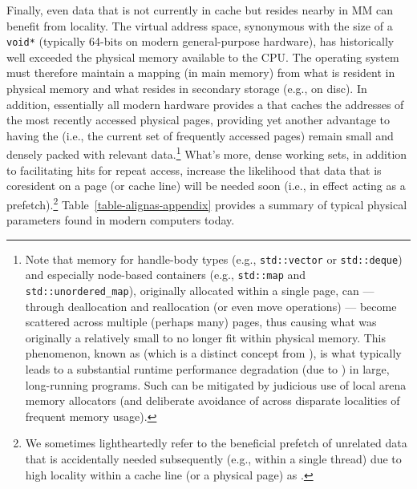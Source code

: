 Finally, even data that is not currently in cache but resides nearby in
MM can benefit from locality. The virtual address space, synonymous with
the size of a \lstinline!void*! (typically 64-bits on modern general-purpose hardware), has historically well exceeded the physical memory
available to the CPU. The operating system must therefore maintain a
mapping (in main memory) from what is resident in physical memory and
what resides in secondary storage (e.g., on disc). In addition,
essentially all modern hardware provides a
 that caches the addresses of the
most recently accessed physical pages, providing yet another advantage
to having the  (i.e., the current set of frequently
accessed pages) remain small and densely packed with relevant
data.{\cprotect\footnote{Note that memory for handle-body
types (e.g., \lstinline!std::vector! or \lstinline!std::deque!) and
especially node-based containers (e.g., \lstinline!std::map! and
\lstinline!std::unordered_map!), originally allocated within a single
page, can --- through deallocation and reallocation (or even move
operations) --- become scattered across multiple (perhaps many)
 pages, thus causing what was originally a relatively small 
to no longer fit within physical memory. This phenomenon, known as
 (which is a distinct concept from
), is what typically leads to a substantial
runtime performance degradation (due to ) in large,
long-running programs. Such  can be mitigated by
judicious use of local arena memory allocators (and deliberate
avoidance of  across disparate localities of
  frequent memory usage).}} What's more, dense working sets, in addition
to facilitating hits for repeat access, increase the likelihood that
data that is coresident on a page (or cache line) will be needed soon
(i.e., in effect acting as a prefetch).{\cprotect\footnote{We sometimes
lightheartedly refer to the beneficial prefetch of unrelated data that
is accidentally needed subsequently (e.g., within a single thread) due
to high locality within a cache line (or a physical page) as
  .}} Table~\ref{table-alignas-appendix} provides a summary of typical physical parameters found in modern computers today.

